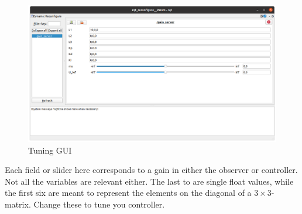 \begin{figure}[H]
    \centering
    \includegraphics[width=\textwidth]{Images/dynamic-reconfigure.png}
    \caption{Tuning GUI}
    \label{fig:tuner}
\end{figure}
    
Each field or slider here corresponds to a gain in either the observer or controller. Not all the variables are relevant either. The last to are single float values, while the first six are meant to represent the elements on the diagonal of a $3\times3$-matrix. Change these to tune you controller. 
